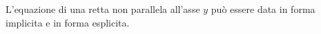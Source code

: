 L’equazione di una retta non parallela all’asse \( \displaystyle y\) può essere data in forma implicita e in forma esplicita.